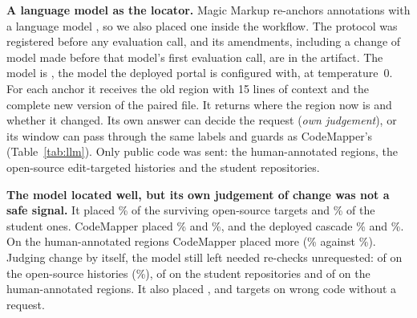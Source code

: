 \textbf{A language model as the locator.} Magic Markup re-anchors annotations with a language model \cite{misback2024magic}, so we also placed one inside the workflow. The protocol was registered before any evaluation call, and its amendments, including a change of model made before that model's first evaluation call, are in the artifact. The model is \wjModel{}, the model the deployed portal is configured with, at temperature~0. For each anchor it receives the old region with 15 lines of context and the complete new version of the paired file. It returns where the region now is and whether it changed. Its own answer can decide the request (\emph{own judgement}), or its window can pass through the same labels and guards as CodeMapper's (Table~\ref{tab:llm}). Only public code was sent: the human-annotated regions, the open-source edit-targeted histories and the student repositories.



\textbf{The model located well, but its own judgement of change was not a safe signal.} It placed \wjPubSelfPlace\% of the surviving open-source targets and \wjStuSelfPlace\% of the student ones. CodeMapper placed \wjPubCmQPlace\% and \wjStuCmQPlace\%, and the deployed cascade \wjPubDepPlace\% and \wjStuDepPlace\%. On the human-annotated regions CodeMapper placed more (\wjHumCmQPlace\% against \wjHumSelfPlace\%). Judging change by itself, the model still left needed re-checks unrequested: \wjPubSelfMissK{} of \wjPubSelfMissN{} on the open-source histories (\wjPubSelfMiss\%), \wjStuSelfMissK{} of \wjStuSelfMissN{} on the student repositories and \wjHumSelfMissK{} of \wjHumSelfMissN{} on the human-annotated regions. It also placed \wjPubSelfSilentK{}, \wjStuSelfSilentK{} and \wjHumSelfSilentK{} targets on wrong code without a request.

